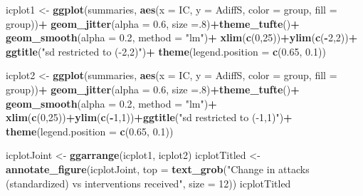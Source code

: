\documentclass[10pt,dvipsnames,enabledeprecatedfontcommands]{scrartcl}
\newenvironment{Shaded}{\begin{snugshade}}{\end{snugshade}}
\newcommand{\KeywordTok}[1]{\textcolor[rgb]{0.13,0.29,0.53}{\textbf{#1}}}
\newcommand{\DataTypeTok}[1]{\textcolor[rgb]{0.13,0.29,0.53}{#1}}
\newcommand{\DecValTok}[1]{\textcolor[rgb]{0.00,0.00,0.81}{#1}}
\newcommand{\FloatTok}[1]{\textcolor[rgb]{0.00,0.00,0.81}{#1}}
\newcommand{\StringTok}[1]{\textcolor[rgb]{0.31,0.60,0.02}{#1}}
\newcommand{\OperatorTok}[1]{\textcolor[rgb]{0.81,0.36,0.00}{\textbf{#1}}}
\newcommand{\NormalTok}[1]{#1}
\begin{document}
\begin{Shaded}
\begin{Highlighting}[]
\NormalTok{icplot1 <-}\StringTok{ }\KeywordTok{ggplot}\NormalTok{(summaries, }\KeywordTok{aes}\NormalTok{(}\DataTypeTok{x =}\NormalTok{ IC, }\DataTypeTok{y =}\NormalTok{ AdiffS, }\DataTypeTok{color =}\NormalTok{ group, }\DataTypeTok{fill =}\NormalTok{ group))}\OperatorTok{+}
\StringTok{  }\KeywordTok{geom_jitter}\NormalTok{(}\DataTypeTok{alpha =} \FloatTok{0.6}\NormalTok{, }\DataTypeTok{size =}\NormalTok{.}\DecValTok{8}\NormalTok{)}\OperatorTok{+}\KeywordTok{theme_tufte}\NormalTok{()}\OperatorTok{+}
\StringTok{  }\KeywordTok{geom_smooth}\NormalTok{(}\DataTypeTok{alpha =} \FloatTok{0.2}\NormalTok{, }\DataTypeTok{method =} \StringTok{"lm"}\NormalTok{)}\OperatorTok{+}
\StringTok{  }\KeywordTok{xlim}\NormalTok{(}\KeywordTok{c}\NormalTok{(}\DecValTok{0}\NormalTok{,}\DecValTok{25}\NormalTok{))}\OperatorTok{+}\KeywordTok{ylim}\NormalTok{(}\KeywordTok{c}\NormalTok{(}\OperatorTok{-}\DecValTok{2}\NormalTok{,}\DecValTok{2}\NormalTok{))}\OperatorTok{+}
\StringTok{  }\KeywordTok{ggtitle}\NormalTok{(}\StringTok{"sd restricted to (-2,2)"}\NormalTok{)}\OperatorTok{+}
\StringTok{  }\KeywordTok{theme}\NormalTok{(}\DataTypeTok{legend.position =} \KeywordTok{c}\NormalTok{(}\FloatTok{0.65}\NormalTok{, }\FloatTok{0.1}\NormalTok{))}

\NormalTok{icplot2 <-}\StringTok{  }\KeywordTok{ggplot}\NormalTok{(summaries, }\KeywordTok{aes}\NormalTok{(}\DataTypeTok{x =}\NormalTok{ IC, }\DataTypeTok{y =}\NormalTok{ AdiffS, }\DataTypeTok{color =}\NormalTok{ group, }\DataTypeTok{fill =}\NormalTok{ group))}\OperatorTok{+}
\StringTok{  }\KeywordTok{geom_jitter}\NormalTok{(}\DataTypeTok{alpha =} \FloatTok{0.6}\NormalTok{, }\DataTypeTok{size =}\NormalTok{.}\DecValTok{8}\NormalTok{)}\OperatorTok{+}\KeywordTok{theme_tufte}\NormalTok{()}\OperatorTok{+}
\StringTok{  }\KeywordTok{geom_smooth}\NormalTok{(}\DataTypeTok{alpha =} \FloatTok{0.2}\NormalTok{, }\DataTypeTok{method =} \StringTok{"lm"}\NormalTok{)}\OperatorTok{+}
\StringTok{  }\KeywordTok{xlim}\NormalTok{(}\KeywordTok{c}\NormalTok{(}\DecValTok{0}\NormalTok{,}\DecValTok{25}\NormalTok{))}\OperatorTok{+}\KeywordTok{ylim}\NormalTok{(}\KeywordTok{c}\NormalTok{(}\OperatorTok{-}\DecValTok{1}\NormalTok{,}\DecValTok{1}\NormalTok{))}\OperatorTok{+}\KeywordTok{ggtitle}\NormalTok{(}\StringTok{"sd restricted to (-1,1)"}\NormalTok{)}\OperatorTok{+}
\StringTok{  }\KeywordTok{theme}\NormalTok{(}\DataTypeTok{legend.position =} \KeywordTok{c}\NormalTok{(}\FloatTok{0.65}\NormalTok{, }\FloatTok{0.1}\NormalTok{))}

\NormalTok{icplotJoint <-}\StringTok{ }\KeywordTok{ggarrange}\NormalTok{(icplot1, icplot2) }
\NormalTok{icplotTitled <-}\StringTok{ }\KeywordTok{annotate_figure}\NormalTok{(icplotJoint, }
  \DataTypeTok{top =} \KeywordTok{text_grob}\NormalTok{(}\StringTok{"Change in attacks (standardized) vs interventions received"}\NormalTok{,  }\DataTypeTok{size =} \DecValTok{12}\NormalTok{))}
\NormalTok{icplotTitled}
\end{Highlighting}
\end{Shaded}
\end{document}
